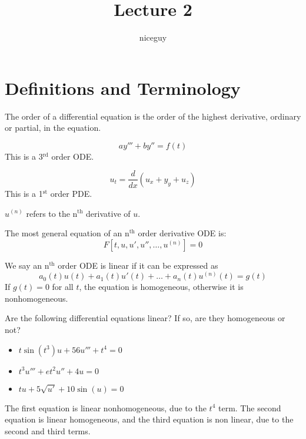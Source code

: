 \documentclass[12pt]{article}
\author{niceguy}
\title{Lecture 2}
\begin{document}
\maketitle

\section{Definitions and Terminology}

\begin{defn}
The order of a differential equation is the order of the highest derivative, ordinary or partial, in the equation.
\end{defn}

\begin{ex}
$$ay''' + by'' = f(t)$$
This is a 3$^{\text{rd}}$ order ODE.
\end{ex}

\begin{ex}
$$u_t = \frac{d}{dx}(u_x + y_y + u_z)$$
This is a 1$^{\text{st}}$ order PDE.
\end{ex}

\begin{defn}
$u^{(n)}$ refers to the n$^{\text{th}}$ derivative of $u$.
\end{defn}

The most general equation of an n$^{\text{th}}$ order derivative ODE is:
$$F[t, u, u', u'', \dots, u^{(n)}] = 0$$

\begin{defn}
We say an n$^{\text{th}}$ order ODE is linear if it can be expressed as
$$a_0(t)u(t) + a_1(t)u'(t) + \dots + a_n(t)u^{(n)}(t) = g(t)$$
If $g(t) = 0$ for all $t$, the equation is homogeneous, otherwise it is nonhomogeneous.
\end{defn}

\begin{ex}
Are the following differential equations linear? If so, are they homogeneous or not?

\begin{itemize}
\item $t\sin(t^3) u + 56u''' + t^4 = 0$ \\
\item $t^3u''' + et^2u'' + 4u = 0$ \\
\item $tu + 5\sqrt{u'} + 10\sin(u) = 0$ \\
\end{itemize}
The first equation is linear nonhomogeneous, due to the $t^4$ term. The second equation is linear homogeneous, and the third equation is non linear, due to the second and third terms.
\end{ex}
\end{document}
